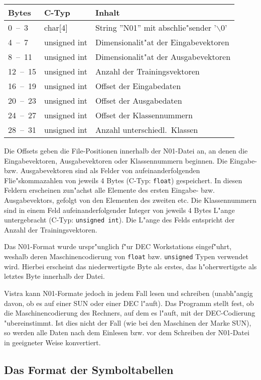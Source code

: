 \nopagebreak
\begin{tabular}[t]{l|l|l}
{\bf Bytes} & {\bf C-Typ} & {\bf Inhalt} \\ \hline
0~--~3 & char[4] & String ''N01'' mit abschlie"sender '$\backslash0$' \\
4~--~7 & unsigned int & Dimensionalit"at der Eingabevektoren \\
8~--~11 & unsigned int & Dimensionalit"at der Ausgabevektoren \\
12~--~15 & unsigned int & Anzahl der Trainingsvektoren \\
16~--~19 & unsigned int & Offset der Eingabedaten \\
20~--~23 & unsigned int & Offset der Ausgabedaten \\
24~--~27 & unsigned int & Offset der Klassennummern \\
28~--~31 & unsigned int & Anzahl unterschiedl.~Klassen 
\end{tabular}  

Die Offsets geben die File-Positionen innerhalb der N01-Datei an, an denen
die Eingabevektoren, Ausgabevektoren oder Klassennummern beginnen.
Die Eingabe- bzw. Ausgabevektoren sind als Felder von aufeinanderfolgenden
Flie"skommazahlen von jeweils 4 Bytes (C-Typ: {\tt float}) gespeichert.
In diesen Feldern erscheinen zun"achst alle Elemente des ersten 
Eingabe- bzw. Ausgabevektors, gefolgt von den Elementen des zweiten etc.
Die Klassennummern sind in einem Feld aufeinanderfolgender
Integer von jeweils 4 Bytes L"ange untergebracht (C-Typ: {\tt unsigned int}).
Die L"ange des Felds entspricht der Anzahl der Trainingsvektoren.

Das N01-Format wurde urspr"unglich f"ur DEC Workstations eingef"uhrt,
weshalb deren Maschinencodierung von {\tt float} bzw. {\tt unsigned} Typen
verwendet wird.
Hierbei erscheint das niederwertigste Byte als erstes,
das h"oherwertigste als letztes Byte innerhalb der Datei.

Vistra kann N01-Formate jedoch in jedem Fall lesen und schreiben
(unabh"angig davon, ob es auf einer SUN oder einer DEC l"auft).
Das Programm stellt fest, ob die Maschinencodierung des Rechners, auf dem
es l"auft, mit der DEC-Codierung "ubereinstimmt.
Ist dies nicht der Fall (wie bei den Maschinen der Marke SUN), so
werden alle Daten nach dem Einlesen bzw. vor dem Schreiben der N01-Datei
in geeigneter Weise konvertiert. 
    
\subsection{Das Format der Symboltabellen}
\label{symtab}

